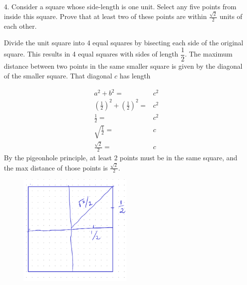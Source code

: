 \documentclass{article}
\begin{document}
\begin{exercise}{}{}
	{4. Consider a square whose side-length is one unit. Select any
		five points from inside this square. Prove that at least two of these points
		are within $\frac{\sqrt{2}}{2}$ units of each other.}
	\begin{alist}
		\item Divide the unit square into 4 equal squares by bisecting each side of the
		original square. This results in 4 equal squares with sides of length
		$\dfrac{1}{2}$. The maximum distance between two points in the same smaller square is
		given by the diagonal of the smaller square. That diagonal $c$ has length
	\end{alist}
	\begin{align*}
		a^2 + b^2 =                                               & c^2 \\
		\left(\frac{1}{2}\right)^2 + \left(\frac{1}{2}\right)^2 = & c^2 \\
		\frac{1}{2} =                                             & c^2 \\
		\sqrt{\frac{1}{2}} =                                      & c   \\
		\frac{\sqrt{2}}{2} =                                      & c
	\end{align*}
	By the pigeonhole principle, at least 2 points must be in the same square, and
	the max distance of those points is $\frac{\sqrt{2}}{2}$.
\end{exercise}{}{}

\begin{figure}
	\centering
	\includegraphics[width=0.5\textwidth]{images/12-03-04.png}
\end{figure}
\end{document}

